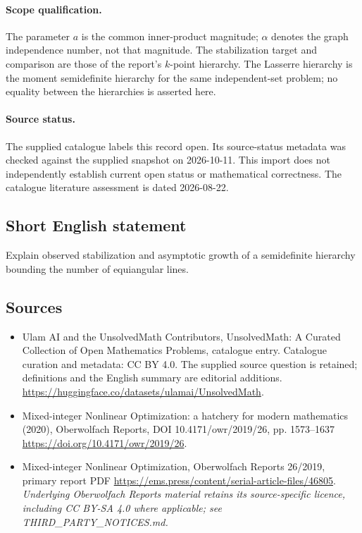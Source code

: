 \documentclass[11pt]{article}
\begin{document}
\paragraph{Scope qualification.}
The parameter $a$ is the common inner-product magnitude; $\alpha$ denotes the graph independence number, not that magnitude. The stabilization target and comparison are those of the report's $k$-point hierarchy. The Lasserre hierarchy is the moment semidefinite hierarchy for the same independent-set problem; no equality between the hierarchies is asserted here.
\paragraph{Source status.}
The supplied catalogue labels this record open. Its source-status metadata was checked against the supplied snapshot on 2026-10-11. This import does not independently establish current open status or mathematical correctness. The catalogue literature assessment is dated 2026-08-22.
\subsection{Short English statement}
Explain observed stabilization and asymptotic growth of a semidefinite hierarchy bounding the number of equiangular lines.
\subsection{Sources}
\begin{itemize}
\item[S1] Ulam AI and the UnsolvedMath Contributors, UnsolvedMath: A Curated Collection of Open Mathematics Problems, catalogue entry. Catalogue curation and metadata: CC BY 4.0. The supplied source question is retained; definitions and the English summary are editorial additions.
\url{https://huggingface.co/datasets/ulamai/UnsolvedMath}.
\item[S2] Mixed-integer Nonlinear Optimization: a hatchery for modern mathematics (2020), Oberwolfach Reports, DOI 10.4171/owr/2019/26, pp. 1573--1637
\url{https://doi.org/10.4171/owr/2019/26}.
\item[S3] Mixed-integer Nonlinear Optimization, Oberwolfach Reports 26/2019, primary report PDF
\url{https://ems.press/content/serial-article-files/46805}.
\textit{Underlying Oberwolfach Reports material retains its source-specific licence, including CC BY-SA 4.0 where applicable; see THIRD\_PARTY\_NOTICES.md.}
\end{itemize}
\end{document}
